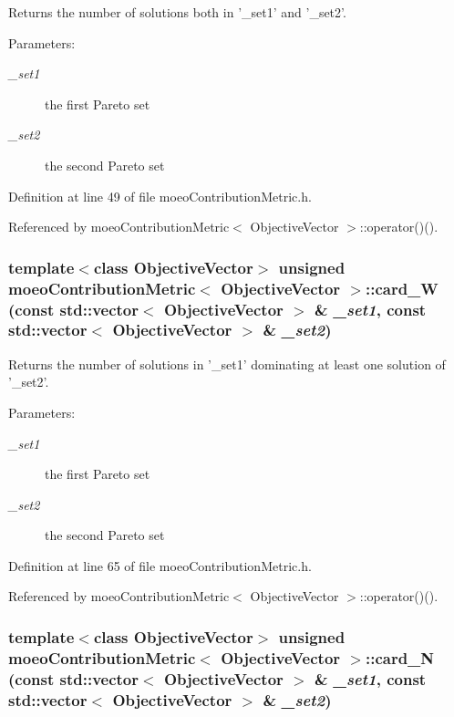 Returns the number of solutions both in '\_\-set1' and '\_\-set2'. 

\begin{Desc}
\item[Parameters:]
\begin{description}
\item[{\em \_\-set1}]the first Pareto set \item[{\em \_\-set2}]the second Pareto set \end{description}
\end{Desc}


Definition at line 49 of file moeo\-Contribution\-Metric.h.

Referenced by moeo\-Contribution\-Metric$<$ Objective\-Vector $>$::operator()().
\subsubsection{\setlength{\rightskip}{0pt plus 5cm}template$<$class Objective\-Vector$>$ unsigned {\bf moeo\-Contribution\-Metric}$<$ Objective\-Vector $>$::card\_\-W (const std::vector$<$ Objective\-Vector $>$ \& {\em \_\-set1}, const std::vector$<$ Objective\-Vector $>$ \& {\em \_\-set2})\hspace{0.3cm}{\tt  [inline, private]}}\label{classmoeoContributionMetric_3fabe93859e033328c1b84db114b3bb0}


Returns the number of solutions in '\_\-set1' dominating at least one solution of '\_\-set2'. 

\begin{Desc}
\item[Parameters:]
\begin{description}
\item[{\em \_\-set1}]the first Pareto set \item[{\em \_\-set2}]the second Pareto set \end{description}
\end{Desc}


Definition at line 65 of file moeo\-Contribution\-Metric.h.

Referenced by moeo\-Contribution\-Metric$<$ Objective\-Vector $>$::operator()().
\subsubsection{\setlength{\rightskip}{0pt plus 5cm}template$<$class Objective\-Vector$>$ unsigned {\bf moeo\-Contribution\-Metric}$<$ Objective\-Vector $>$::card\_\-N (const std::vector$<$ Objective\-Vector $>$ \& {\em \_\-set1}, const std::vector$<$ Objective\-Vector $>$ \& {\em \_\-set2})\hspace{0.3cm}{\tt  [inline, private]}}\label{classmoeoContributionMetric_a21770ee1ddb12bb67c1f7ab755d04c7}


